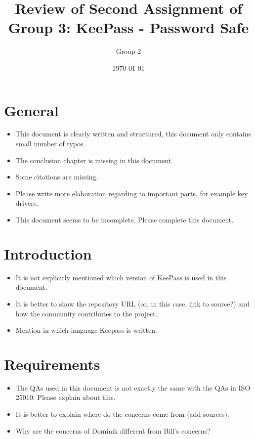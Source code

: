 \documentclass[a4paper,10pt]{article}
\author{Group 2}
\date{\monthyeardate\today}
\title{Review of Second Assignment of Group 3: KeePass - Password Safe}
\begin{document}
\maketitle

\section{General}
\begin{itemize}
	\item This document is clearly written and structured, this document only contains small number of typos.
	\item The conclusion chapter is missing in this document.
	\item Some citations are missing.
	\item Please write more elaboration regarding to important parts, for example key drivers.
	\item This document seems to be incomplete. Please complete this document.
\end{itemize}

\section{Introduction}
\begin{itemize}
	\item It is not explicitly mentioned which version of KeePass is used in this document.
	\item It is better to show the repository URL (or, in this case, link to source?) and how the community contributes to the project.
	\item Mention in which language Keepass is written.
\end{itemize}

\section{Requirements}
\begin{itemize}
	\item The QAs used in this document is not exactly the same with the QAs in ISO 25010. Please explain about this.
	\item It is better to explain where do the concerns come from (add sources).
	\item Why are the concerns of Dominik different from Bill's concerns?

\end{itemize}
\end{document}
